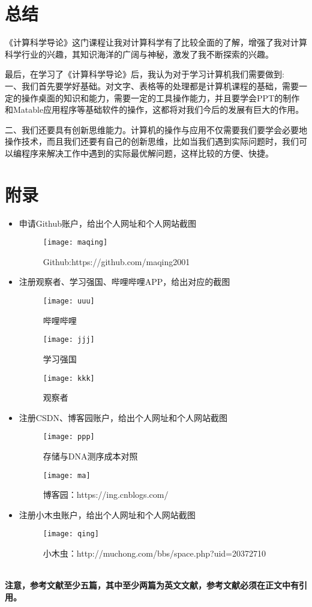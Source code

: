 \documentclass{article}
\begin{document}
\section{总结}
《计算科学导论》这门课程让我对计算科学有了比较全面的了解，增强了我对计算科学行业的兴趣，其知识海洋的广阔与神秘，激发了我不断探索的兴趣。\par
最后，在学习了《计算科学导论》后，我认为对于学习计算机我们需要做到:  
一、我们首先要学好基础。对文字、表格等的处理都是计算机课程的基础，需要一定的操作桌面的知识和能力，需要一定的工具操作能力，并且要学会PPT的制作和Matable应用程序等基础软件的操作，这都将对我们今后的发展有巨大的作用。\par
二、我们还要具有创新思维能力。计算机的操作与应用不仅需要我们要学会必要地操作技术，而且我们还要有自己的创新思维，比如当我们遇到实际问题时，我们可以编程序来解决工作中遇到的实际最优解问题，这样比较的方便、快捷。\par


\section{附录}
\begin{itemize}
    \item 申请Github账户，给出个人网址和个人网站截图
    \begin{figure}[H]
    	\centering
    	\texttt{[image: maqing]}
    	\caption{Github:https://github.com/maqing2001}
    	\label{fig:maqing}
    \end{figure}
     
    \item 注册观察者、学习强国、哔哩哔哩APP，给出对应的截图
     \begin{figure}[H]
    	\centering
    	\texttt{[image: uuu]}
    	\caption{哔哩哔哩}
    	\label{fig:uuu}
    \end{figure}
      \begin{figure}[H]
     	\centering
     	\texttt{[image: jjj]}
     	\caption{学习强国}
     	\label{fig:jjj}
     \end{figure} 
  \begin{figure}[H]
 	\centering
 	\texttt{[image: kkk]}
 	\caption{观察者}
 	\label{fig:rrr}
 \end{figure}
    \item 注册CSDN、博客园账户，给出个人网址和个人网站截图
     \begin{figure}[H]
     	\centering
     	\texttt{[image: ppp]}
     	\caption{存储与DNA测序成本对照}
     	\label{fig:rrr}
     \end{figure}
 \begin{figure}[H]
 	\centering
 	\texttt{[image: ma]}
 	\caption{博客园：https://ing.cnblogs.com/}
 	\label{fig:ma}
 \end{figure}
    \item 注册小木虫账户，给出个人网址和个人网站截图
     \begin{figure}[H]
     	\centering
     	\texttt{[image: qing]}
     	\caption{小木虫：http://muchong.com/bbs/space.php?uid=20372710}
     	\label{fig:qing}
     \end{figure}
\end{itemize}


\hspace*{\fill} \\

{\bf 注意，参考文献至少五篇，其中至少两篇为英文文献，参考文献必须在正文中有引用。}


\end{document}
